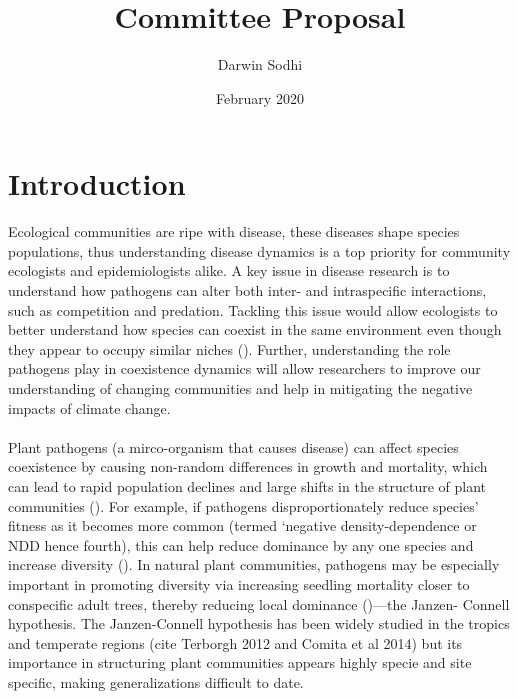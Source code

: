 \documentclass{article}
\title{Committee Proposal}
\author{Darwin Sodhi}
\date{February 2020}
\begin{document}
\maketitle

\section{Introduction}

Ecological communities are ripe with disease, these diseases shape species populations, thus understanding disease dynamics is a top priority for community ecologists and epidemiologists alike. A key issue in disease research is to understand how pathogens can alter both inter- and intraspecific interactions, such as competition and predation. Tackling this issue would allow ecologists to better understand how species can coexist in the same environment even though they appear to occupy similar niches (\citep{Freckleton2006}). Further, understanding the role pathogens play in coexistence dynamics will allow researchers to improve our understanding of changing communities and help in mitigating the negative impacts of climate change.  

\paragraph{}Plant pathogens (a mirco-organism that causes disease) can affect species coexistence by causing non-random differences in growth and mortality, which can lead to rapid population declines and large shifts in the structure of plant communities (\citep{Gilbert2002}). For example, if pathogens disproportionately  reduce species’ fitness as it becomes more common (termed ‘negative density-dependence or NDD hence fourth), this can help reduce dominance by any one species and increase diversity (\citep{Chesson2000}). In natural plant communities, pathogens may be especially important in promoting diversity via increasing seedling mortality closer to conspecific adult trees, thereby reducing local dominance (\citep{HilleRisLambers2012})—the Janzen- Connell hypothesis. The Janzen-Connell hypothesis has been widely studied in the tropics and temperate regions (cite Terborgh 2012 and Comita et al 2014) but its importance in structuring plant communities appears highly specie and site specific, making generalizations difficult to date.  
\end{document}
